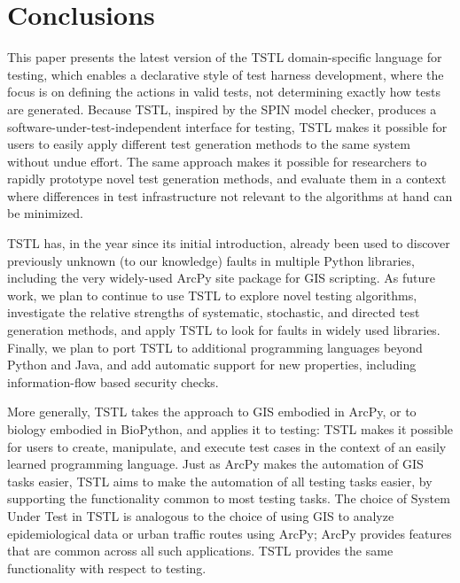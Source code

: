 \section{Conclusions}
\label{conclusion}

This paper presents the latest version of the TSTL
\cite{NFM15,ISSTA15,tstl} domain-specific language for testing, which
enables a declarative style of test harness development, where the
focus is on defining the actions in valid tests, not determining
exactly how tests are generated.  Because TSTL, inspired by the SPIN
model checker, produces a software-under-test-independent interface
for testing, TSTL makes it possible for users to easily apply
different test generation methods to the same system without undue
effort.  The same approach makes it possible for researchers to rapidly prototype novel test generation
methods, and evaluate them in a context where differences in test
infrastructure not relevant to the algorithms at hand can be minimized.

TSTL has, in the year since its initial introduction,
already been used to discover previously unknown (to our knowledge)
faults in multiple Python libraries, including the very widely-used
ArcPy site package for GIS scripting. 
As future work, we plan to continue to use TSTL to explore novel
testing algorithms, investigate the relative strengths of systematic,
stochastic, and directed test generation methods, and apply TSTL to
look for faults in widely used libraries.  Finally, we plan to
port TSTL to additional
programming languages beyond Python and Java, and add automatic
support for new properties, including
information-flow based security checks.

More generally, TSTL takes the approach to GIS embodied in ArcPy, or
to biology embodied in BioPython, and applies it to testing:  TSTL
makes it possible for users to create, manipulate, and execute test
cases in the context of an easily learned programming language.  Just
as ArcPy makes the automation of GIS tasks easier, TSTL aims to make
the automation of all testing tasks easier, by supporting the
functionality common to most testing tasks.  The choice of System
Under Test in TSTL is analogous to the choice of using GIS to analyze
epidemiological data or urban traffic routes using ArcPy; ArcPy
provides features that are common across all such applications.  TSTL
provides the same functionality with respect to testing.